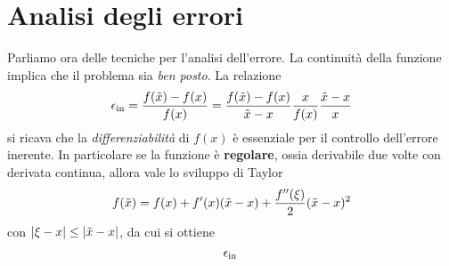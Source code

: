\section{Analisi degli errori}
Parliamo ora delle tecniche per l'analisi dell'errore. La continuità della funzione implica che il problema sia
\emph{ben posto}. La relazione
\[
	\epsilon_\text{in} = \frac{f(\tilde{x}) - f(x)}{f(x)} =
	\frac{f(\tilde{x}) - f(x)}{\tilde{x} - x} \frac{x}{f(x)} \frac{\tilde{x} - x}{x}
\]
si ricava che la \emph{differenziabilità} di $f(x)$ è essenziale per il controllo dell'errore inerente. In
particolare se la funzione è \textbf{regolare}, ossia derivabile due volte con derivata continua, allora vale
lo sviluppo di Taylor
\[ f(\tilde{x}) = f(x) + f'(x) (\tilde{x} - x) + \frac{f''(\xi)}{2} (\tilde{x} - x)^2 \]
con $|\xi - x| \leq |\tilde{x} - x|$, da cui si ottiene
\[ \epsilon_\text{in} \frac{}{} \]